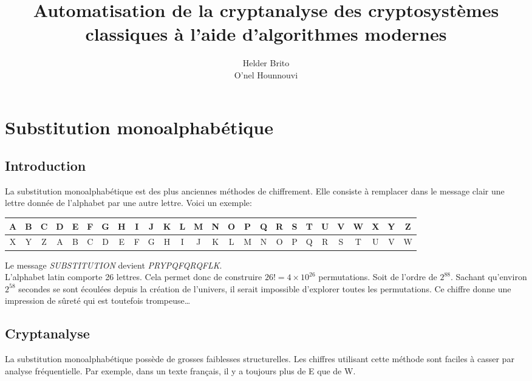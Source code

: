 \documentclass[a4paper]{article}
\title{Automatisation de la cryptanalyse des cryptosystèmes classiques
à l’aide d’algorithmes modernes}
\author{Helder Brito\\O'nel Hounnouvi}
\date{}
\begin{document}
\maketitle 
\section{Substitution monoalphabétique}
\subsection{Introduction}
La substitution monoalphabétique est des plus anciennes méthodes de chiffrement. Elle consiste
à remplacer dans le message clair une lettre donnée de l'alphabet par une autre lettre. Voici un exemple:

\vspace{1em}
    \begin{adjustbox}{width=\textwidth,center}
        \begin{tabular}{|c|c|c|c|c|c|c|c|c|c|c|c|c|c|c|c|c|c|c|c|c|c|c|c|c|c|}
            \hline
            A & B & C & D & E & F & G & H & I & J & K & L & M & N & O & P & Q & R & S & T & U & V & W & X & Y & Z \\
            \hline
            X & Y & Z & A & B & C & D & E & F & G & H & I & J & K & L & M & N & O & P & Q & R & S & T & U & V & W \\
            \hline
        \end{tabular}
    \end{adjustbox}
\vspace{1em}

Le message \textit{SUBSTITUTION} devient \textit{PRYPQFQRQFLK}. \\

L'alphabet latin comporte 26 lettres. Cela permet donc de construire $26! = 4 \times 10^{26}$ permutations. Soit de l'ordre de $2^{88}$.
Sachant qu'environ $2^{58}$ secondes se sont écoulées depuis la création de l'univers, il serait impossible d'explorer toutes les permutations.
Ce chiffre donne une impression de sûreté qui est toutefois trompeuse\ldots

\subsection{Cryptanalyse}
La substitution monoalphabétique possède de grosses faiblesses structurelles. Les chiffres utilisant cette méthode sont faciles à casser par 
analyse fréquentielle. Par exemple, dans un texte français, il y a toujours plus de E que de W.
\end{document}

